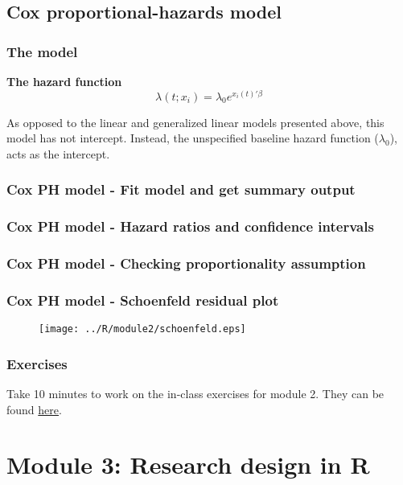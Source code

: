 \documentclass{beamer}
\begin{document}
\subsection{Cox proportional-hazards model}

\begin{frame}
    \frametitle{The model}
    \textbf{The hazard function}
    \[\lambda(t; x_i) = \lambda_0 e^{x_i(t)' \beta}\]

    \bigskip

    As opposed to the linear and generalized linear models presented above,
    this model has not intercept. Instead, the unspecified baseline hazard function
    ($\lambda_0$), acts as the intercept.
\end{frame}


\begin{frame}[fragile]
    \frametitle{Cox PH model - Fit model and get summary output}
    \fontsize{8}{10}\selectfont
    
\end{frame}


\begin{frame}[fragile]
    \frametitle{Cox PH model - Hazard ratios and confidence intervals}
    \fontsize{9}{11}\selectfont
    
\end{frame}


\begin{frame}[fragile]
    \frametitle{Cox PH model - Checking proportionality assumption}
    \fontsize{9}{11}\selectfont
    
\end{frame}


\begin{frame}[fragile]
    \frametitle{Cox PH model - Schoenfeld residual plot}
    \begin{figure}[b]
      \centering
      \texttt{[image: ../R/module2/schoenfeld.eps]}
    \end{figure}
\end{frame}


\begin{frame}
    \frametitle{Exercises}
    Take 10 minutes to work on the in-class exercises for module 2.
    They can be found \href{https://github.com/rnitulescu/RcourseOncology2021/blob/master/exercises2.R}{here}.
\end{frame}



\section{Module 3: Research design in R}
\end{document}
